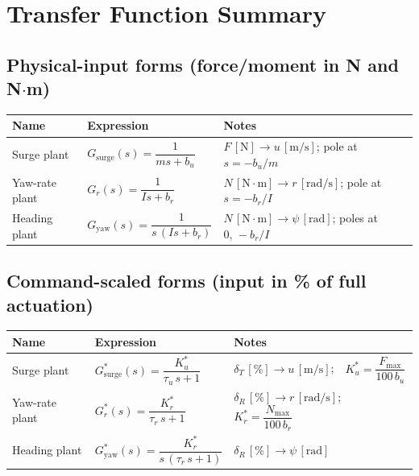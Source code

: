 \documentclass[../../book.tex]{subfiles}
\begin{document}
\section{Transfer Function Summary}

\subsection*{Physical-input forms (force/moment in N and N$\cdot$m)}
\begin{center}
\begin{tabular}{L{3.0cm} L{5.5cm} L{4.7cm}}
  \textbf{Name} & \textbf{Expression} & \textbf{Notes} \\
  \midrule
  Surge plant &
    $\displaystyle G_{\mathrm{surge}}(s) = \dfrac{1}{ms + b_u}$ &
    $F\,[\mathrm{N}] \to u\,[\mathrm{m/s}]$; pole at $s=-b_u/m$ \\[10pt]

  Yaw-rate plant &
    $\displaystyle G_r(s) = \dfrac{1}{Is + b_r}$ &
    $N\,[\mathrm{N{\cdot}m}] \to r\,[\mathrm{rad/s}]$; pole at $s=-b_r/I$ \\[10pt]

  Heading plant &
    $\displaystyle G_{\mathrm{yaw}}(s) = \dfrac{1}{s\,(Is + b_r)}$ &
    $N\,[\mathrm{N{\cdot}m}] \to \psi\,[\mathrm{rad}]$; poles at $0,\,-b_r/I$ \\[10pt]
  \bottomrule
\end{tabular}
\end{center}

\subsection*{Command-scaled forms (input in \% of full actuation)}
\begin{center}
\begin{tabular}{L{3.0cm} L{5.5cm} L{4.7cm}}
  \textbf{Name} & \textbf{Expression} & \textbf{Notes} \\
  \midrule
  Surge plant &
    $\displaystyle G_{\mathrm{surge}}^*(s) = \dfrac{K_u^*}{\tau_u\,s + 1}$ &
    $\delta_T\,[\%] \to u\,[\mathrm{m/s}]$;\ \ $K_u^* = \dfrac{F_{\max}}{100\,b_u}$ \\[12pt]

  Yaw-rate plant &
    $\displaystyle G_r^*(s) = \dfrac{K_r^*}{\tau_r\,s + 1}$ &
    $\delta_R\,[\%] \to r\,[\mathrm{rad/s}]$;\ \ $K_r^* = \dfrac{N_{\max}}{100\,b_r}$ \\[12pt]

  Heading plant &
    $\displaystyle G_{\mathrm{yaw}}^*(s) = \dfrac{K_r^*}{s\,(\tau_r\,s + 1)}$ &
    $\delta_R\,[\%] \to \psi\,[\mathrm{rad}]$ \\[10pt]
  \bottomrule
\end{tabular}
\end{center}
\end{document}
